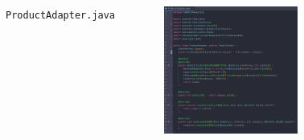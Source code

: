 \documentclass{beamer}
\begin{document}
\begin{frame}
\begin{columns}
\begin{figure}
        \end{figure}
        \indent \texttt{ProductAdapter.java}
        \begin{figure}
            \centering
            \includegraphics[width=\textwidth]{images/38.png}
        \end{figure}
    \end{columns}
\end{frame}
\end{document}

